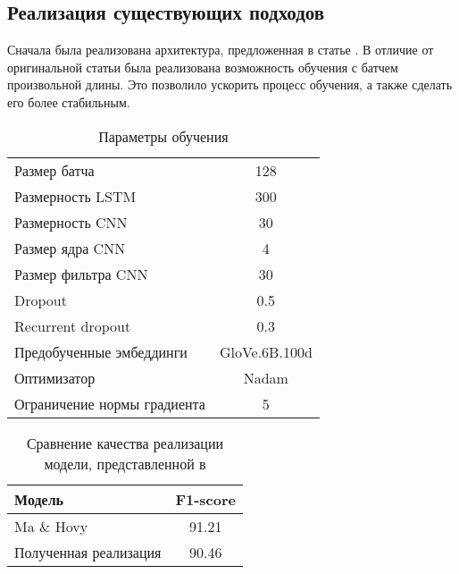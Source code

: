 \documentclass[a4paper,14pt]{extarticle}
\begin{document}

\subsection{Реализация существующих подходов}

Сначала была реализована архитектура, предложенная в статье \cite{1603.01354}. В отличие от оригинальной статьи была реализована возможность обучения с батчем произвольной длины. Это позволило ускорить процесс обучения, а также сделать его более стабильным.

\begin{table}[H]
    \caption{Параметры обучения}
    \label{progress}
    \begin{center}
    \begin{tabular}{l|c}
        Размер батча & 128 \\
        Размерность LSTM & 300 \\
        Размерность CNN & 30 \\
        Размер ядра CNN & 4 \\
        Размер фильтра CNN & 30 \\
        Dropout & 0.5 \\
        Recurrent dropout & 0.3 \\
        Предобученные эмбеддинги & GloVe.6B.100d \\
        Оптимизатор & Nadam \\
        Ограничение нормы градиента & 5 \\
    \end{tabular}
    \end{center}
\end{table}

\begin{table}[H]
    \caption{Сравнение качества реализации модели, представленной в \cite{1603.01354}}
    \label{progress}
    \begin{center}
    \begin{tabular}{l|c}
        Модель                 & F1-score \\
        \hline
        Ma \& Hovy             & 91.21    \\
        Полученная реализация  & 90.46    \\
    \end{tabular}
    \end{center}
\end{table}
\end{document}
